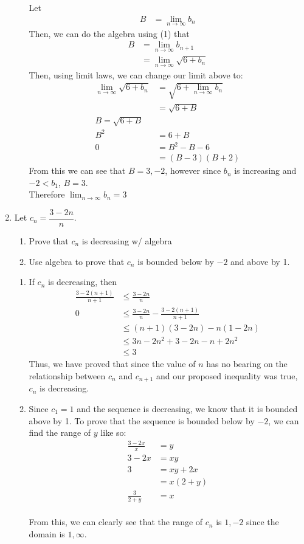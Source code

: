 \documentclass{article}
\begin{document}
\begin{enumerate}[label=\textbf{(9.\arabic*)}]
\begin{enumerate}
Let
\begin{align*}
B &= \lim_{n\to\infty} b_n
\end{align*}
Then, we can do the algebra using (1) that 
\begin{align*}
B &= \lim_{n\to\infty} b_{n+1}\\
&= \lim_{n\to\infty} \sqrt{6+b_n}
\end{align*}
Then, using limit laws, we can change our limit above to:
\begin{align*}
\lim_{n\to\infty} \sqrt{6+b_n} &= \sqrt{6+\lim_{n\to\infty} b_n}\\
&= \sqrt{6+B}\\
B= \sqrt{6+B}\\
B^2 &= 6+B\\
0 &= B^2-B-6\\
&= \left(B-3\right)\left(B+2\right)
\end{align*}
From this we can see that $B=3,-2$, however since $b_n$ is increasing and $-2<b_1$, $B=3$.\\
Therefore $\lim_{n\to\infty} b_n=3$
\end{enumerate}

\newpage

\item Let $c_n=\dfrac{3-2n}{n}$.
\begin{enumerate}
\item Prove that ${c_n}$ is decreasing w/ algebra
\item Use algebra to prove that ${c_n}$ is bounded below by $-2$ and above by 1.
\end{enumerate}

\begin{enumerate}
\item If $c_n$ is decreasing, then
\begin{align*}
\frac{3-2(n+1)}{n+1} &\le \frac{3-2n}{n}\\
0 &\le \frac{3-2n}{n} - \frac{3-2(n+1)}{n+1}\\
&\le (n+1)(3-2n)-n(1-2n)\\
&\le 3n-2n^2+3-2n-n+2n^2\\
&\le 3	
\end{align*}
Thus, we have proved that since the value of $n$ has no bearing on the relationship between $c_n$ and $c_{n+1}$ and our proposed inequality was true, ${c_n}$ is decreasing.
\item Since $c_1=1$ and the sequence is decreasing, we know that it is bounded above by 1. To prove that the sequence is bounded below by $-2$, we can find the range of $y$ like so:
\begin{align*}
\frac{3-2x}{x} &= y\\
3-2x &= xy\\
3 &= xy+2x\\
&= x(2+y)\\
\frac{3}{2+y} &= x
\end{align*} \\
From this, we can clearly see that the range of $c_n$ is ${1,-2}$ since the domain is ${1,\infty}$.
\end{enumerate}


\end{enumerate}
\end{document}
